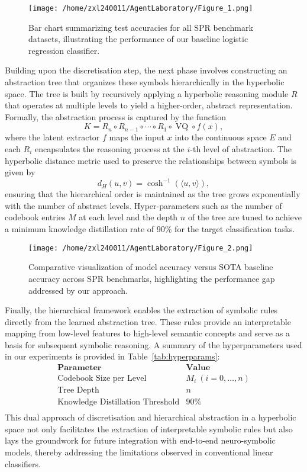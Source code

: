 \documentclass{article}
\begin{document}
\begin{figure}[h]
\caption{Bar chart summarizing test accuracies for all SPR benchmark datasets, illustrating the performance of our baseline logistic regression classifier.}
\centering
\texttt{[image: /home/zxl240011/AgentLaboratory/Figure\_1.png]}
\label{fig:fig1}
\end{figure}

Building upon the discretisation step, the next phase involves constructing an abstraction tree that organizes these symbols hierarchically in the hyperbolic space. The tree is built by recursively applying a hyperbolic reasoning module \( R \) that operates at multiple levels to yield a higher-order, abstract representation. Formally, the abstraction process is captured by the function
\[
K = R_n \circ R_{n-1} \circ \cdots \circ R_1 \circ \operatorname{VQ} \circ f(x),
\]
where the latent extractor \( f \) maps the input \( x \) into the continuous space \( E \) and each \( R_i \) encapsulates the reasoning process at the \( i \)-th level of abstraction. The hyperbolic distance metric used to preserve the relationships between symbols is given by
\[
d_H(u, v) = \cosh^{-1}(\langle u, v \rangle),
\]
ensuring that the hierarchical order is maintained as the tree grows exponentially with the number of abstract levels. Hyper-parameters such as the number of codebook entries \( M \) at each level and the depth \( n \) of the tree are tuned to achieve a minimum knowledge distillation rate of 90\% for the target classification tasks.

\begin{figure}[h]
\caption{Comparative visualization of model accuracy versus SOTA baseline accuracy across SPR benchmarks, highlighting the performance gap addressed by our approach.}
\centering
\texttt{[image: /home/zxl240011/AgentLaboratory/Figure\_2.png]}
\label{fig:fig2}
\end{figure}

Finally, the hierarchical framework enables the extraction of symbolic rules directly from the learned abstraction tree. These rules provide an interpretable mapping from low-level features to high-level semantic concepts and serve as a basis for subsequent symbolic reasoning. A summary of the hyperparameters used in our experiments is provided in Table~\ref{tab:hyperparams}:
\[
\begin{array}{l|c}
\textbf{Parameter} & \textbf{Value} \\ \hline
\text{Codebook Size per Level} & M_i \ (i=0,\ldots,n) \\
\text{Tree Depth} & n \\
\text{Knowledge Distillation Threshold} & 90\% \\
\end{array}
\]
This dual approach of discretisation and hierarchical abstraction in a hyperbolic space not only facilitates the extraction of interpretable symbolic rules but also lays the groundwork for future integration with end-to-end neuro-symbolic models, thereby addressing the limitations observed in conventional linear classifiers.
\end{document}

